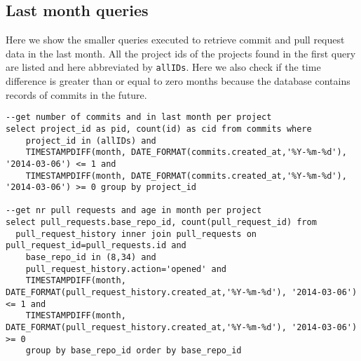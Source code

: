 \begin{appendices}
\section{Last month queries} \label{app:lastMonth}
Here we show the smaller queries executed to retrieve commit and pull request data in the last month. All the project ids of the projects found in the first query are listed and here abbreviated by \texttt{allIDs}. Here we also check if the time difference is greater than or equal to zero months because the database contains records of commits in the future.
\begin{scriptsize}
\begin{verbatim}
--get number of commits and in last month per project
select project_id as pid, count(id) as cid from commits where 
    project_id in (allIDs) and 
    TIMESTAMPDIFF(month, DATE_FORMAT(commits.created_at,'%Y-%m-%d'), '2014-03-06') <= 1 and 
    TIMESTAMPDIFF(month, DATE_FORMAT(commits.created_at,'%Y-%m-%d'), '2014-03-06') >= 0 group by project_id

--get nr pull requests and age in month per project 
select pull_requests.base_repo_id, count(pull_request_id) from 
  pull_request_history inner join pull_requests on pull_request_id=pull_requests.id and 
    base_repo_id in (8,34) and 
    pull_request_history.action='opened' and 
    TIMESTAMPDIFF(month, DATE_FORMAT(pull_request_history.created_at,'%Y-%m-%d'), '2014-03-06') <= 1 and 
    TIMESTAMPDIFF(month, DATE_FORMAT(pull_request_history.created_at,'%Y-%m-%d'), '2014-03-06') >= 0 
    group by base_repo_id order by base_repo_id
\end{verbatim}
\end{scriptsize}

\end{appendices}
